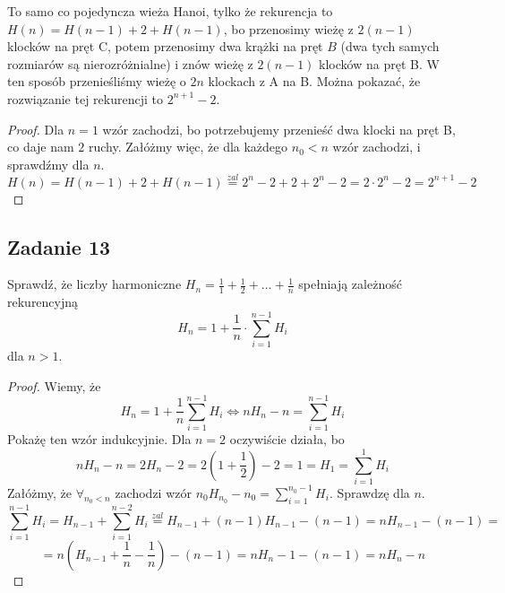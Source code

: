 \documentclass[a4paper]{article}
\begin{document}
To samo co pojedyncza wieża Hanoi, tylko że rekurencja to $H(n)=H(n-1)+2+H(n-1)$, bo przenosimy wieżę z $2(n-1)$ klocków na pręt C, potem przenosimy dwa krążki na pręt $B$ (dwa tych samych rozmiarów są nierozróżnialne) i znów wieżę z $2(n-1)$ klocków na pręt B. W ten sposób przenieśliśmy wieżę o $2n$ klockach z A na B. Można pokazać, że rozwiązanie tej rekurencji to $2^{n+1}-2$.
\begin{proof}
Dla $n=1$ wzór zachodzi, bo potrzebujemy przenieść dwa klocki na pręt B, co daje nam $2$ ruchy. Załóżmy więc, że dla każdego $n_0<n$ wzór zachodzi, i sprawdźmy dla $n$.
$$H(n)=H(n-1)+2+H(n-1) \overset{zal}{=} 2^{n}-2 + 2 + 2^{n}-2  = 2\cdot 2^n - 2 = 2^{n+1}-2$$
\end{proof}


\subsection*{Zadanie 13}
Sprawdź, że liczby harmoniczne $H_n = \frac{1}{1} + \frac{1}{2} + \ldots + \frac{1}{n}$ spełniają zależność rekurencyjną $$H_n = 1 + \frac{1}{n} \cdot \sum_{i=1}^{n-1} H_i$$ dla $n > 1$.

\begin{proof}
Wiemy, że 
$$H_n=1+\frac{1}{n} \sum\limits_{i=1}^{n-1} H_i \Leftrightarrow nH_n-n=\sum\limits_{i=1}^{n-1} H_i $$
Pokażę ten wzór indukcyjnie. Dla $n=2$ oczywiście działa, bo
$$nH_n-n=2H_n-2=2(1+\frac{1}{2})-2=1=H_1=\sum\limits_{i=1}^{1} H_i $$
Załóżmy, że $\forall_{n_0<n}$ zachodzi wzór $n_0H_{n_0}-n_0=\sum\limits_{i=1}^{n_0-1} H_i $. Sprawdzę dla $n$.
$$\sum\limits_{i=1}^{n-1} H_i = H_{n-1} + \sum\limits_{i=1}^{n-2} H_i \overset{zal}{=} H_{n-1} + (n-1)H_{n-1}-(n-1) = nH_{n-1}-(n-1) = $$ $$= n(H_{n-1} + \frac{1}{n}-\frac{1}{n})-(n-1) = nH_n  - 1 - (n-1) = nH_n - n$$
\end{proof}
\end{document}

